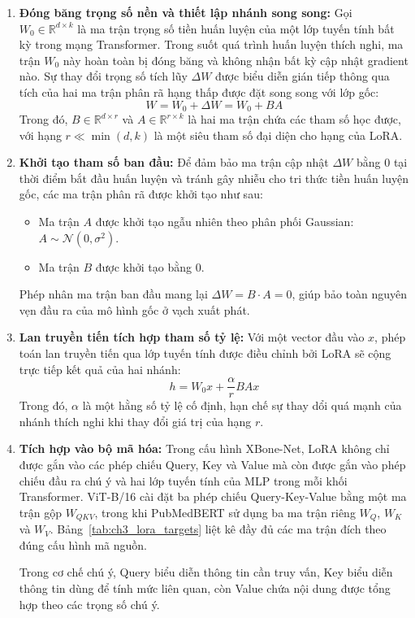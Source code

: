 \begin{enumerate}
    \item \textbf{Đóng băng trọng số nền và thiết lập nhánh song song:}
    Gọi $W_0 \in \mathbb{R}^{d \times k}$ là ma trận trọng số tiền huấn luyện của một lớp tuyến tính bất kỳ trong mạng Transformer. Trong suốt quá trình huấn luyện thích nghi, ma trận $W_0$ này hoàn toàn bị đóng băng và không nhận bất kỳ cập nhật gradient nào. Sự thay đổi trọng số tích lũy $\Delta W$ được biểu diễn gián tiếp thông qua tích của hai ma trận phân rã hạng thấp được đặt song song với lớp gốc:
    \begin{equation}
    W = W_0 + \Delta W = W_0 + B A
    \end{equation}
    Trong đó, $B \in \mathbb{R}^{d \times r}$ và $A \in \mathbb{R}^{r \times k}$ là hai ma trận chứa các tham số học được, với hạng $r \ll \min(d, k)$ là một siêu tham số đại diện cho hạng của LoRA.

    \item \textbf{Khởi tạo tham số ban đầu:}
    Để đảm bảo ma trận cập nhật $\Delta W$ bằng $0$ tại thời điểm bắt đầu huấn luyện và tránh gây nhiễu cho tri thức tiền huấn luyện gốc, các ma trận phân rã được khởi tạo như sau:
    \begin{itemize}
        \item Ma trận $A$ được khởi tạo ngẫu nhiên theo phân phối Gaussian: $A \sim \mathcal{N}(0, \sigma^2)$.
        \item Ma trận $B$ được khởi tạo bằng $0$.
    \end{itemize}
    Phép nhân ma trận ban đầu mang lại $\Delta W = B \cdot A = 0$, giúp bảo toàn nguyên vẹn đầu ra của mô hình gốc ở vạch xuất phát.

    \item \textbf{Lan truyền tiến tích hợp tham số tỷ lệ:}
    Với một vector đầu vào $x$, phép toán lan truyền tiến qua lớp tuyến tính được điều chỉnh bởi LoRA sẽ cộng trực tiếp kết quả của hai nhánh:
    \begin{equation}
    h = W_0 x + \frac{\alpha}{r} B A x
    \end{equation}
    Trong đó, $\alpha$ là một hằng số tỷ lệ cố định, hạn chế sự thay dổi quá mạnh của nhánh thích nghi khi thay đổi giá trị của hạng $r$.

    \item \textbf{Tích hợp vào bộ mã hóa:}
    Trong cấu hình XBone-Net, LoRA không chỉ được gắn vào các phép chiếu Query, Key và Value mà còn được gắn vào phép chiếu đầu ra chú ý và hai lớp tuyến tính của MLP trong mỗi khối Transformer. ViT-B/16 cài đặt ba phép chiếu Query-Key-Value bằng một ma trận gộp $W_{QKV}$, trong khi PubMedBERT sử dụng ba ma trận riêng $W_Q$, $W_K$ và $W_V$. Bảng~\ref{tab:ch3_lora_targets} liệt kê đầy đủ các ma trận đích theo đúng cấu hình mã nguồn.

    Trong cơ chế chú ý, Query biểu diễn thông tin cần truy vấn, Key biểu diễn thông tin dùng để tính mức liên quan, còn Value chứa nội dung được tổng hợp theo các trọng số chú ý.

    \end{enumerate}

